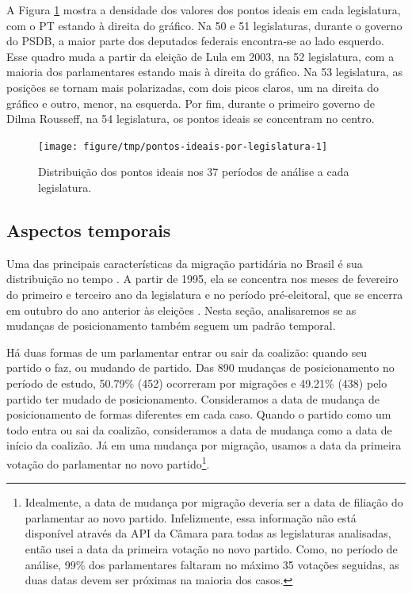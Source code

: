 \documentclass[a4paper,titlepage]{ppgi}\usepackage[]{graphicx}\usepackage[]{color}
\newenvironment{knitrout}{}{} %
\begin{document}
A Figura \ref{fig:pontos-ideais-por-legislatura} mostra a densidade dos valores
dos pontos ideais em cada legislatura, com o PT estando à direita do gráfico.
Na 50\textordfeminine{} e 51\textordfeminine{} legislaturas, durante o governo
do PSDB, a maior parte dos deputados federais encontra-se ao lado esquerdo.
Esse quadro muda a partir da eleição de Lula em 2003, na 52\textordfeminine{}
legislatura, com a maioria dos parlamentares estando mais à direita do gráfico.
Na 53\textordfeminine{} legislatura, as posições se tornam mais polarizadas, com
dois picos claros, um na direita do gráfico e outro, menor, na esquerda. Por
fim, durante o primeiro governo de Dilma Rousseff, na 54\textordfeminine{}
legislatura, os pontos ideais se concentram no centro.

\begin{knitrout}
\color{fgcolor}\begin{figure}
\texttt{[image: figure/tmp/pontos-ideais-por-legislatura-1]} \caption[Distribuição dos pontos ideais nos 37 períodos de análise a cada legislatura]{Distribuição dos pontos ideais nos 37 períodos de análise a cada legislatura.}\label{fig:pontos-ideais-por-legislatura}
\end{figure}


\end{knitrout}

\subsection{Aspectos temporais}
\label{cap:desenvolvimento:aspectos-temporais}



Uma das principais características da migração partidária no Brasil é sua
distribuição no tempo \cite{Araujo2000,Melo2004,Freitas2008}. A partir de 1995,
ela se concentra nos meses de fevereiro do primeiro e terceiro ano da
legislatura e no período pré-eleitoral, que se encerra em outubro do ano
anterior às eleições \cite{Freitas2008,Lei9504/1997}. Nesta seção,
analisaremos se as mudanças de posicionamento também seguem um padrão temporal.

Há duas formas de um parlamentar entrar ou sair da coalizão: quando seu partido
o faz, ou mudando de partido. Das 890 mudanças de
posicionamento no período de estudo,
50.79\% (452)
ocorreram por migrações e
49.21\% (438)
pelo partido ter mudado de posicionamento. Consideramos a data de mudança
de posicionamento de formas diferentes em cada caso. Quando o partido como um
todo entra ou sai da coalizão, consideramos a data de mudança como a data de
início da coalizão. Já em uma mudança por migração, usamos a data da primeira
votação do parlamentar no novo partido\footnote{Idealmente, a data de mudança
por migração deveria ser a data de filiação do parlamentar ao novo partido.
Infelizmente, essa informação não está disponível através da \gls{API} da
Câmara para todas as legislaturas analisadas, então usei a data da primeira
votação no novo partido. Como, no período de análise, 99\% dos parlamentares
faltaram no máximo 35 votações seguidas, as duas datas devem ser próximas na
maioria dos casos.}.
\end{document}
